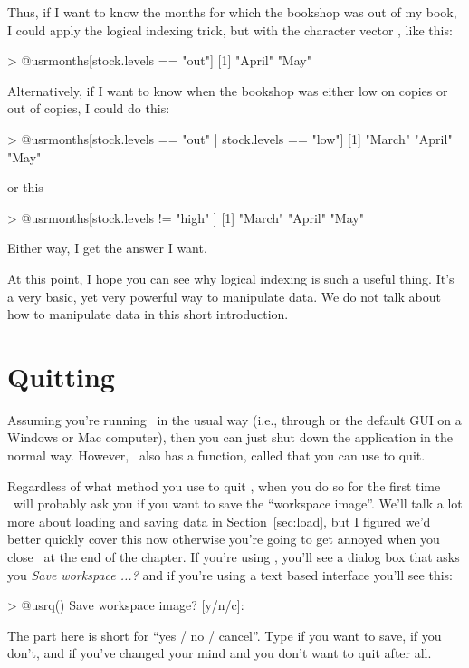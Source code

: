 Thus, if I want to know the months for which the bookshop was out of my book, I could apply the logical indexing trick, but with the character vector , like this:
\begin{rblock1}
> @usr{months[stock.levels == "out"]}
[1] "April" "May"  
\end{rblock1}
Alternatively, if I want to know when the bookshop was either low on copies or out of copies, I could do this:
\begin{rblock1}
> @usr{months[stock.levels == "out" | stock.levels == "low"]}
[1] "March" "April" "May"  
\end{rblock1}
or this
\begin{rblock1}
> @usr{months[stock.levels != "high" ]}
[1] "March" "April" "May"  
\end{rblock1}
Either way, I get the answer I want.

At this point, I hope you can see why logical indexing is such a useful thing. It's a very basic, yet very powerful way to manipulate data. We do not talk about how to manipulate data in this short introduction. 

\section{Quitting \R}

Assuming you're running \R\ in the usual way (i.e., through \Rstudio or the default GUI on a Windows or Mac computer), then you can just shut down the application in the normal way. However, \R\ also has a function, called  that you can use to quit.

Regardless of what method you use to quit \R, when you do so for the first time \R\ will probably ask you if you want to save the ``workspace image''. We'll talk a lot more about loading and saving data in Section~\ref{sec:load}, but I figured we'd better quickly cover this now otherwise you're going to get annoyed when you close \R\ at the end of the chapter. If you're using \Rstudio, you'll see a dialog box that asks you \textit{Save workspace ...?}  and if you're using a text based interface you'll see this:
\begin{rblock1}
> @usr{q()}
Save workspace image? [y/n/c]: 
\end{rblock1}
The  part here is short for ``yes / no / cancel''. Type  if you want to save,  if you don't, and  if you've changed your mind and you don't want to quit after all. 

